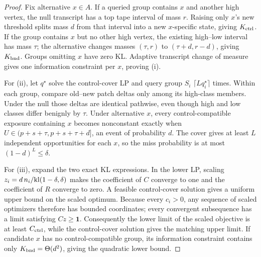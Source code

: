 \begin{proof}
Fix alternative \(x\in A\).  If a queried group contains \(x\) and another
high vertex, the null transcript has a top tape interval of mass \(r\).  Raising
only \(x\)'s new threshold splits mass \(d\) from that interval into a new
\(x\)-specific state, giving \(K_{\rm ctrl}\).  If the group contains \(x\)
but no other high vertex, the existing high--low interval has mass \(\tau\);
the alternative changes masses \((\tau,r)\) to \((\tau+d,r-d)\), giving
\(K_{\rm bnd}\).  Groups omitting \(x\) have zero KL.  Adaptive transcript
change of measure gives one information constraint per \(x\), proving (i).

For (ii), let \(q^\star\) solve the control-cover LP and query group \(S_i\)
\(\lceil Lq_i^\star\rceil\) times.  Within each group, compare old--new patch
deltas only among its high-class members.  Under the null those deltas are
identical pathwise, even though high and low classes differ benignly by
\(\tau\).  Under alternative \(x\), every control-compatible exposure containing
\(x\) becomes nonconstant exactly when
\(U\in(p+s+\tau,p+s+\tau+d]\), an event of probability \(d\).
The cover gives at least \(L\) independent opportunities for each \(x\), so the
miss probability is at most \((1-d)^L\le\delta\).

For (iii), expand the two exact KL expressions.  In the lower LP, scaling
\(z_i=d\,n_i/\mathrm{kl}(1-\delta,\delta)\) makes the coefficient of \(C\) converge to
one and the coefficient of \(R\) converge to zero.  A feasible control-cover
solution gives a uniform upper bound on the scaled optimum.  Because every
\(c_i>0\), any sequence of scaled optimizers therefore has bounded
coordinates; every convergent subsequence has a limit satisfying
\(Cz\ge\mathbf 1\).  Consequently the lower limit of the scaled objective is
at least \(C_{\rm ctrl}\), while the control-cover solution gives the matching
upper limit.  If candidate \(x\) has no control-compatible group, its
information constraint contains only \(K_{\rm bnd}=\Theta(d^2)\), giving the
quadratic lower bound.


\end{proof}
